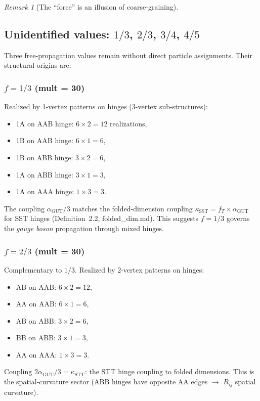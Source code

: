 \documentclass[12pt]{article}
\theoremstyle{remark}
\newtheorem{remark}[theorem]{Remark}
\theoremstyle{definition}
\newcommand{\agut}{\alpha_{\mathrm{GUT}}}
\begin{document}
\begin{remark}[The ``force'' is an illusion of coarse-graining]
\subsection{Unidentified values: $1/3$, $2/3$, $3/4$, $4/5$}
\label{sec:unidentified}

Three free-propagation values remain without direct particle assignments.  Their structural origins are:

\subsubsection{$f = 1/3$ (mult = 30)}

Realized by 1-vertex patterns on hinges (3-vertex sub-structures):
\begin{itemize}
\item 1A on AAB hinge: $6 \times 2 = 12$ realizations,
\item 1B on AAB hinge: $6 \times 1 = 6$,
\item 1B on ABB hinge: $3 \times 2 = 6$,
\item 1A on ABB hinge: $3 \times 1 = 3$,
\item 1A on AAA hinge: $1 \times 3 = 3$.
\end{itemize}
The coupling $\agut/3$ matches the folded-dimension coupling $\kappa_\mathrm{SST} = f_T \times \agut$ for SST hinges (Definition~2.2, folded\_dim.md).  This suggests $f = 1/3$ governs the \emph{gauge boson} propagation through mixed hinges.

\subsubsection{$f = 2/3$ (mult = 30)}

Complementary to $1/3$.  Realized by 2-vertex patterns on hinges:
\begin{itemize}
\item AB on AAB: $6 \times 2 = 12$,
\item AA on AAB: $6 \times 1 = 6$,
\item AB on ABB: $3 \times 2 = 6$,
\item BB on ABB: $3 \times 1 = 3$,
\item AA on AAA: $1 \times 3 = 3$.
\end{itemize}
Coupling $2\agut/3 = \kappa_\mathrm{STT}$: the STT hinge coupling to folded dimensions.  This is the spatial-curvature sector (ABB hinges have opposite AA edges $\to$ $R_{ij}$ spatial curvature).


\end{remark}
\end{document}
